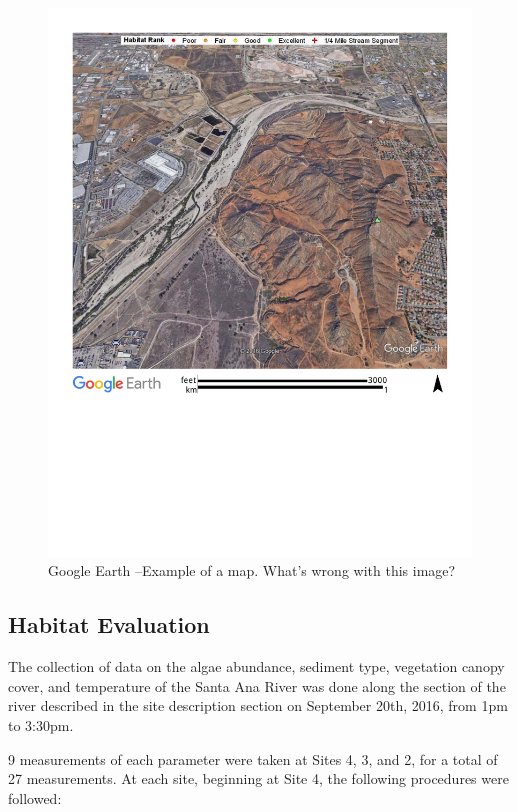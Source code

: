 \documentclass{article}\usepackage[]{graphicx}\usepackage[]{color}
\begin{document}
\begin{figure}
\includegraphics[width=1.00\textwidth]{Figures/SantaAna_SatelliteImage}
\caption{Google Earth --Example of a map. What's wrong with this image?}
\label{SAR_Image}
\end{figure}

\subsection{Habitat Evaluation}

The collection of data on the algae abundance, sediment type, vegetation canopy cover, 
and temperature of the Santa Ana River was done along the section of the river described
in the site description section on September 20th, 2016, from 1pm to 3:30pm.

9 measurements of each parameter were taken at Sites 4, 3, and 2, for a total of 27 measurements. 
At each site, beginning at Site 4, the following procedures were followed: 
\end{document}
